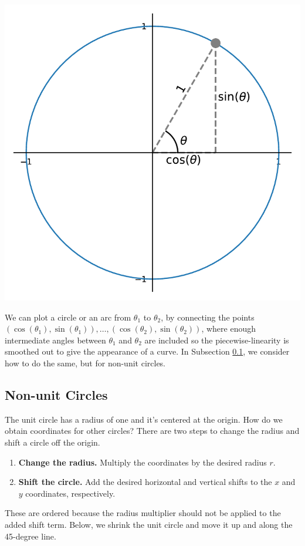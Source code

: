 \begin{center}
    \includegraphics[width = .7\textwidth]{figures/mathplots/unit-circle.pdf}
\end{center}


We can plot a circle or an arc from $\theta_1$ to $\theta_2$, by connecting the points $\left(\cos(\theta_1), \sin(\theta_1)\right), \dots, \left(\cos(\theta_2), \sin(\theta_2)\right)$, where enough intermediate angles between $\theta_1$ and $\theta_2$ are included so the piecewise-linearity is smoothed out to give the appearance of a curve. In Subsection \ref{subsec:nonunit}, we consider how to do the same, but for non-unit circles.


\subsection{Non-unit Circles}\label{subsec:nonunit}

The unit circle has a radius of one and it's centered at the origin. How do we obtain coordinates for other circles? There are two steps to change the radius and shift a circle off the origin. 
\begin{enumerate}
\item \textbf{Change the radius.} Multiply the coordinates by the desired radius $r$.
\item \textbf{Shift the circle.} Add the desired horizontal and vertical shifts to the $x$ and $y$ coordinates, respectively. 
\end{enumerate}
These are ordered because the radius multiplier should not be applied to the added shift term. Below, we shrink the unit circle and move it up and along the 45-degree line.

